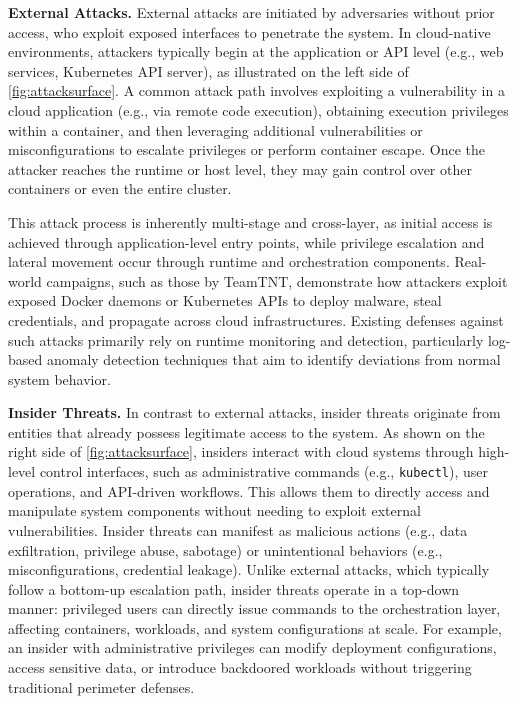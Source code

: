 \textbf{External Attacks.} External attacks are initiated by adversaries without prior access, who exploit exposed interfaces to penetrate the system. In cloud-native environments, attackers typically begin at the application or API level (e.g., web services, Kubernetes API server), as illustrated on the left side of \autoref{fig:attacksurface}. A common attack path involves exploiting a vulnerability in a cloud application (e.g., via remote code execution), obtaining execution privileges within a container, and then leveraging additional vulnerabilities or misconfigurations to escalate privileges or perform container escape. Once the attacker reaches the runtime or host level, they may gain control over other containers or even the entire cluster.

This attack process is inherently multi-stage and cross-layer, as initial access is achieved through application-level entry points, while privilege escalation and lateral movement occur through runtime and orchestration components. Real-world campaigns, such as those by TeamTNT, demonstrate how attackers exploit exposed Docker daemons or Kubernetes APIs to deploy malware, steal credentials, and propagate across cloud infrastructures. Existing defenses against such attacks primarily rely on runtime monitoring and detection, particularly log-based anomaly detection techniques that aim to identify deviations from normal system behavior.

\textbf{Insider Threats.} In contrast to external attacks, insider threats originate from entities that already possess legitimate access to the system. As shown on the right side of \autoref{fig:attacksurface}, insiders interact with cloud systems through high-level control interfaces, such as administrative commands (e.g., \texttt{kubectl}), user operations, and API-driven workflows. This allows them to directly access and manipulate system components without needing to exploit external vulnerabilities. Insider threats can manifest as malicious actions (e.g., data exfiltration, privilege abuse, sabotage) or unintentional behaviors (e.g., misconfigurations, credential leakage). Unlike external attacks, which typically follow a bottom-up escalation path, insider threats operate in a top-down manner: privileged users can directly issue commands to the orchestration layer, affecting containers, workloads, and system configurations at scale. For example, an insider with administrative privileges can modify deployment configurations, access sensitive data, or introduce backdoored workloads without triggering traditional perimeter defenses.

